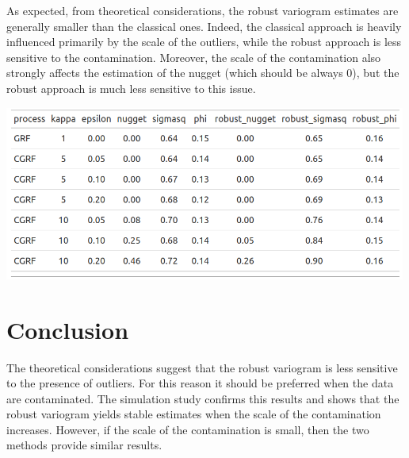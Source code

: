 \documentclass[
  12pt]{article}
\begin{document}
As expected, from theoretical considerations, the robust variogram
estimates are generally smaller than the classical ones. Indeed, the
classical approach is heavily influenced primarily by the scale of the
outliers, while the robust approach is less sensitive to the
contamination. Moreover, the scale of the contamination also strongly
affects the estimation of the nugget (which should be always 0), but the
robust approach is much less sensitive to this issue.

\begin{center}
\includegraphics[width=5.20833in,height=\textheight]{img/variog_est_ols.png}
\end{center}

\section{Conclusion}\label{conclusion}

The theoretical considerations suggest that the robust variogram is less
sensitive to the presence of outliers. For this reason it should be
preferred when the data are contaminated. The simulation study confirms
this results and shows that the robust variogram yields stable estimates
when the scale of the contamination increases. However, if the scale of
the contamination is small, then the two methods provide similar
results.


  
\end{document}
